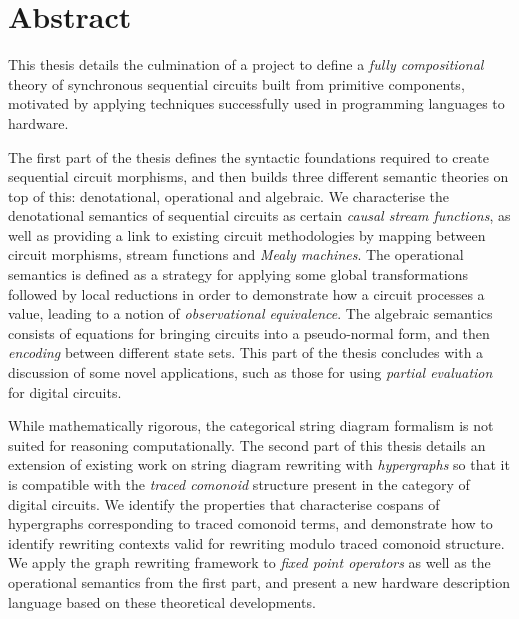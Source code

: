 \chapter{Abstract}

This thesis details the culmination of a project to define a
\emph{fully compositional} theory of synchronous sequential circuits built from
primitive components, motivated by applying techniques successfully used in
programming languages to hardware.

The first part of the thesis defines the syntactic foundations required to
create sequential circuit morphisms, and then builds three different semantic
theories on top of this: denotational, operational and algebraic.
We characterise the denotational semantics of sequential circuits as certain
\emph{causal stream functions}, as well as providing a link to existing circuit
methodologies by mapping between circuit morphisms, stream functions and
\emph{Mealy machines}.
The operational semantics is defined as a strategy for applying some global
transformations followed by local reductions in order to demonstrate how a
circuit processes a value, leading to a notion of
\emph{observational equivalence}.
The algebraic semantics consists of equations for bringing circuits into
a pseudo-normal form, and then \emph{encoding} between different state sets.
This part of the thesis concludes with a discussion of some novel applications,
such as those for using \emph{partial evaluation} for digital circuits.

While mathematically rigorous, the categorical string diagram formalism is not
suited for reasoning computationally.
The second part of this thesis details an extension of existing work on string
diagram rewriting with \emph{hypergraphs} so that it is compatible with the
\emph{traced comonoid} structure present in the category of digital circuits.
We identify the properties that characterise cospans of hypergraphs
corresponding to traced comonoid terms, and demonstrate how to identify
rewriting contexts valid for rewriting modulo traced comonoid structure.
We apply the graph rewriting framework to \emph{fixed point operators} as well as
the operational semantics from the first part, and present a new hardware
description language based on these theoretical developments.